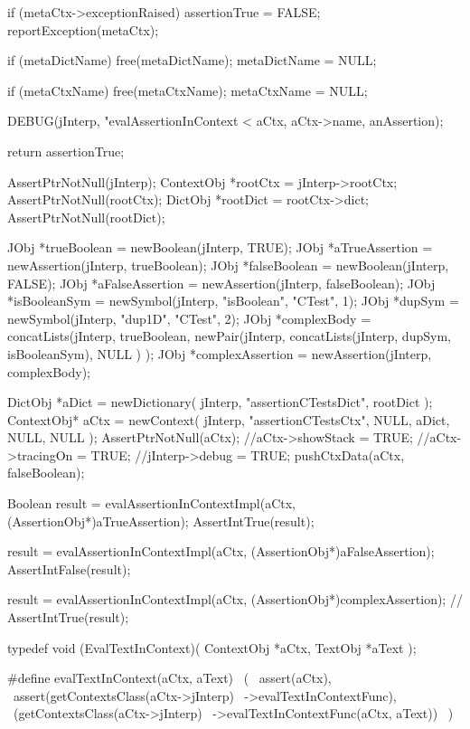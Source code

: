 {  if (metaCtx->exceptionRaised) {
    assertionTrue = FALSE;
    reportException(metaCtx);
  }
  
  if (metaDictName) free(metaDictName);
  metaDictName = NULL;
  
  if (metaCtxName) free(metaCtxName);
  metaCtxName = NULL;
  
  DEBUG(jInterp, "evalAssertionInContext < %
    aCtx, aCtx->name, anAssertion);
    
  return assertionTrue;
}
\stopCCode

\startCTest
  AssertPtrNotNull(jInterp);
  ContextObj *rootCtx = jInterp->rootCtx;
  AssertPtrNotNull(rootCtx);
  DictObj *rootDict = rootCtx->dict;
  AssertPtrNotNull(rootDict);
  
  JObj *trueBoolean      = newBoolean(jInterp, TRUE);
  JObj *aTrueAssertion   = newAssertion(jInterp, trueBoolean);
  JObj *falseBoolean     = newBoolean(jInterp, FALSE);
  JObj *aFalseAssertion  = newAssertion(jInterp, falseBoolean);
  JObj *isBooleanSym     = newSymbol(jInterp, "isBoolean", "CTest", 1);
  JObj *dupSym           = newSymbol(jInterp, "dup1D", "CTest", 2);
  JObj *complexBody      = concatLists(jInterp,
    trueBoolean,
    newPair(jInterp, 
      concatLists(jInterp, dupSym, isBooleanSym),
      NULL
    )
  );
  JObj *complexAssertion = newAssertion(jInterp, complexBody);
  
  DictObj    *aDict = newDictionary(
    jInterp,
    "assertionCTestsDict",
    rootDict
  );
  ContextObj* aCtx = newContext(
    jInterp,
    "assertionCTestsCtx",
    NULL,
    aDict,
    NULL,
    NULL
  );
  AssertPtrNotNull(aCtx);
  //aCtx->showStack = TRUE;
  //aCtx->tracingOn = TRUE;
  //jInterp->debug  = TRUE;
  pushCtxData(aCtx, falseBoolean);

  Boolean result =
    evalAssertionInContextImpl(aCtx, (AssertionObj*)aTrueAssertion);
  AssertIntTrue(result);
  
  result =
    evalAssertionInContextImpl(aCtx, (AssertionObj*)aFalseAssertion);
  AssertIntFalse(result);

  result =
    evalAssertionInContextImpl(aCtx, (AssertionObj*)complexAssertion);
//  AssertIntTrue(result);
\stopCTest
\stopTestCase
\stopTestSuite

\startCHeader
typedef void (EvalTextInContext)(
  ContextObj *aCtx,
  TextObj    *aText
);

#define evalTextInContext(aCtx, aText)      \
  (                                         \
    assert(aCtx),                           \
    assert(getContextsClass(aCtx->jInterp)  \
      ->evalTextInContextFunc),             \
    (getContextsClass(aCtx->jInterp)        \
      ->evalTextInContextFunc(aCtx, aText)) \
  )
\stopCHeader

